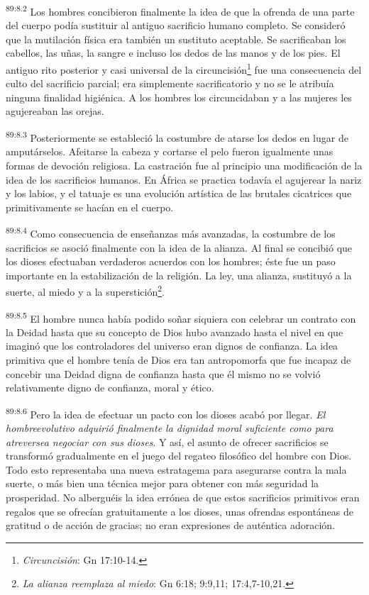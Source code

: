 \par
\textsuperscript{89:8.2} Los hombres concibieron finalmente la idea de que la ofrenda de una parte del cuerpo podía sustituir al antiguo sacrificio humano completo. Se consideró que la mutilación física era también un sustituto aceptable. Se sacrificaban los cabellos, las uñas, la sangre e incluso los dedos de las manos y de los pies. El antiguo rito posterior y casi universal de la circuncisión\footnote{\textit{Circuncisión}: Gn 17:10-14.} fue una consecuencia del culto del sacrificio parcial; era simplemente sacrificatorio y no se le atribuía ninguna finalidad higiénica. A los hombres los circuncidaban y a las mujeres les agujereaban las orejas.

\par
\textsuperscript{89:8.3} Posteriormente se estableció la costumbre de atarse los dedos en lugar de amputárselos. Afeitarse la cabeza y cortarse el pelo fueron igualmente unas formas de devoción religiosa. La castración fue al principio una modificación de la idea de los sacrificios humanos. En África se practica todavía el agujerear la nariz y los labios, y el tatuaje es una evolución artística de las brutales cicatrices que primitivamente se hacían en el cuerpo.

\par
\textsuperscript{89:8.4} Como consecuencia de enseñanzas más avanzadas, la costumbre de los sacrificios se asoció finalmente con la idea de la alianza. Al final se concibió que los dioses efectuaban verdaderos acuerdos con los hombres; éste fue un paso importante en la estabilización de la religión. La ley, una alianza, sustituyó a la suerte, al miedo y a la superstición\footnote{\textit{La alianza reemplaza al miedo}: Gn 6:18; 9:9,11; 17:4,7-10,21.}.

\par
\textsuperscript{89:8.5} El hombre nunca había podido soñar siquiera con celebrar un contrato con la Deidad hasta que su concepto de Dios hubo avanzado hasta el nivel en que imaginó que los controladores del universo eran dignos de confianza. La idea primitiva que el hombre tenía de Dios era tan antropomorfa que fue incapaz de concebir una Deidad digna de confianza hasta que él mismo no se volvió relativamente digno de confianza, moral y ético.

\par
\textsuperscript{89:8.6} Pero la idea de efectuar un pacto con los dioses acabó por llegar. \textit{El hombreevolutivo adquirió finalmente la dignidad moral suficiente como para atreversea negociar con sus dioses}. Y así, el asunto de ofrecer sacrificios se transformó gradualmente en el juego del regateo filosófico del hombre con Dios. Todo esto representaba una nueva estratagema para asegurarse contra la mala suerte, o más bien una técnica mejor para obtener con más seguridad la prosperidad. No alberguéis la idea errónea de que estos sacrificios primitivos eran regalos que se ofrecían gratuitamente a los dioses, unas ofrendas espontáneas de gratitud o de acción de gracias; no eran expresiones de auténtica adoración.

